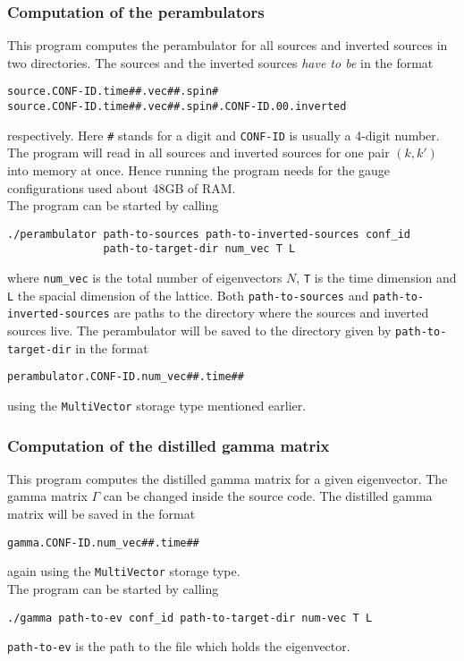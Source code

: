     \subsubsection{Computation of the perambulators}
        This program computes the perambulator for all sources and inverted sources in two directories.
        The sources and the inverted sources \emph{have to be} in the format
        \begin{verbatim}
source.CONF-ID.time##.vec##.spin#
source.CONF-ID.time##.vec##.spin#.CONF-ID.00.inverted\end{verbatim}
        respectively. Here \verb+#+ stands for a digit and \verb+CONF-ID+ is usually a 4-digit number. The program will read in all sources and inverted sources for one pair $(k,k')$ into memory at once. Hence running the program needs for the gauge configurations used about 48GB of RAM.\\The program can be started by calling
        \begin{verbatim}
./perambulator path-to-sources path-to-inverted-sources conf_id
               path-to-target-dir num_vec T L\end{verbatim}
        where \verb+num_vec+ is the total number of eigenvectors $N$, \verb+T+ is the time dimension and \verb+L+ the spacial dimension of the lattice. Both \verb+path-to-sources+ and \verb+path-to-inverted-sources+ are paths to the directory where the sources and inverted sources live. The perambulator will be saved to the directory given by \verb+path-to-target-dir+ in the format
        \begin{verbatim}
perambulator.CONF-ID.num_vec##.time##\end{verbatim}
        using the \verb+MultiVector+ storage type mentioned earlier.
    
    \subsubsection{Computation of the distilled gamma matrix}
        This program computes the distilled gamma matrix for a given eigenvector. The gamma matrix $\Gamma$ can be changed inside the source code. The distilled gamma matrix will be saved in the format
        \begin{verbatim}
gamma.CONF-ID.num_vec##.time##\end{verbatim}
        again using the \verb+MultiVector+ storage type.\\
        The program can be started by calling
        \begin{verbatim}
./gamma path-to-ev conf_id path-to-target-dir num-vec T L\end{verbatim}
        \verb+path-to-ev+ is the path to the file which holds the eigenvector.
        
